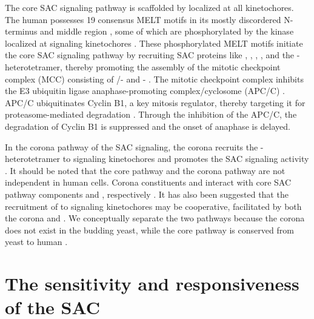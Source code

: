 The core SAC signaling pathway is scaffolded by  localized at all kinetochores. The human  possesses 19 consensus MELT motifs in its mostly discordered N-terminus and middle region \cite{MELTEvolution}, some of which are phosphorylated by the kinase  localized at signaling kinetochores \cite{MPS1-KNL1_London2012, MPS1-KNL1_Shepperd2012, MPS1-KNL1_Yamagishi2012, MPS1Localization_Ji, MPS1Localization_Hiruma}. These phosphorylated MELT motifs initiate the core SAC signaling pathway by recruiting SAC proteins like , , , , and the - heterotetramer, thereby promoting the assembly of the mitotic checkpoint complex (MCC) consisting of /- and - \cite{RecombinantKNL1, MELTActivity, BubBiochem, BubR1TwoPools, BUB1CD1-MAD1CStructure, Faesen2017, BUB1-CDC20-MAD1, Tripartite, SpMCC}. The mitotic checkpoint complex inhibits the E3 ubiquitin ligase anaphase-promoting complex/cyclosome (APC/C) \cite{APC-MCC_Alfieri2016, APC-MCC_Yamaguchi2016}. APC/C ubiquitinates Cyclin B1, a key mitosis regulator, thereby targeting it for proteasome-mediated degradation \cite{CyclinB1Degradation_Clute+Pines1999, CyclinB1Degradation_Chang2003, SeparaseStructure}. Through the inhibition of the APC/C, the degradation of Cyclin B1 is suppressed and the onset of anaphase is delayed.

In the corona pathway of the SAC signaling, the corona recruits the - heterotetramer to signaling kinetochores and promotes the SAC signaling activity \cite{CoronaActivatesSAC}. It should be noted that the core pathway and the corona pathway are not independent in human cells. Corona constituents  and  interact with core SAC pathway components  and , respectively \cite{CENPELocalization-BUBR1, CENP-FLimitsStripping}. It has also been suggested that the recruitment of  to signaling kinetochores may be cooperative, facilitated by both the corona and  \cite{MIS12-CEP57-MAD1-MAD2, siROD_Zhang2019}. We conceptually separate the two pathways because the corona does not exist in the budding yeast, while the core pathway is conserved from yeast to human \cite{YeastNoRZZ}.

\section{The sensitivity and responsiveness of the SAC}
\label{Sensitivity+Responsiveness}


